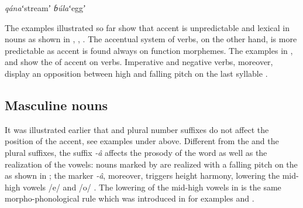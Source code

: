 \documentclass[output=paper]{LSP/langsci}
\begin{document}
\begin{exe}
\ex \label{ex:Petrollino:qánabúla} \begin{xlist}
\ex \textit{qána}\hspace{15mm}ʻstreamʼ
\ex \textit{ɓúla}\hspace{16mm}ʻeggʼ
\end{xlist}
\end{exe}

The examples illustrated so far show that accent is unpredictable and lexical in nouns as shown in , , . The accentual system of  verbs, on the other hand, is more predictable as accent is found always on function morphemes. The examples in ,  and  show the  of accent on verbs. Imperative and negative verbs, moreover, display an opposition between high and falling pitch on the last syllable .  

\subsection{Masculine nouns} \label{sec:Petrollino:masculinenouns}

It was illustrated earlier that   and plural number suffixes do not affect the position of the accent, see examples under  above. Different from the  and the plural suffixes, the  suffix \textit{-â} affects the prosody of the word as well as the realization of the vowels: nouns marked by   are realized with a falling pitch on the  as shown in ; the   marker \textit{-â}, moreover, triggers height harmony, lowering the mid-high vowels /e/ and /o/ . The lowering of the mid-high vowels in  is the same morpho-phonological rule which was introduced in  for examples  and .
\end{document}
